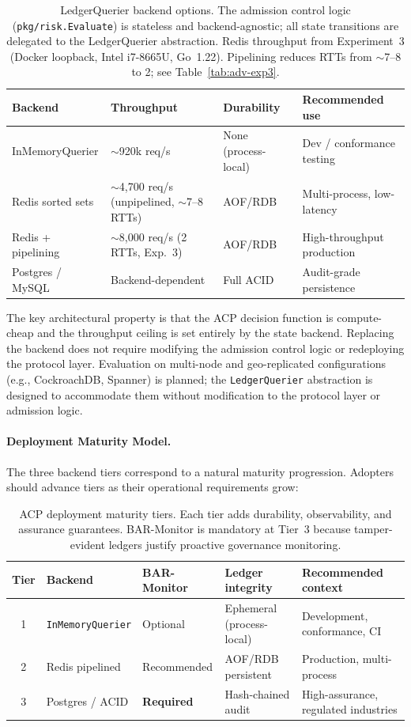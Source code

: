 \documentclass[11pt]{article}
\theoremstyle{definition}
\begin{document}
\begin{table}[h!]
\centering\small
\begin{tabular}{lp{4.2cm}lp{3.0cm}}
\toprule
Backend & Throughput & Durability & Recommended use \\
\midrule
InMemoryQuerier   & $\sim$920k req/s  & None (process-local) & Dev / conformance testing \\
Redis sorted sets & $\sim$4{,}700 req/s (unpipelined, $\sim$7--8 RTTs) & AOF/RDB & Multi-process, low-latency \\
Redis + pipelining & $\sim$8{,}000 req/s (2 RTTs, Exp.~3) & AOF/RDB & High-throughput production \\
Postgres / MySQL  & Backend-dependent & Full ACID & Audit-grade persistence \\
\bottomrule
\end{tabular}
\caption{LedgerQuerier backend options.
The admission control logic (\texttt{pkg/risk.Evaluate}) is stateless and backend-agnostic;
all state transitions are delegated to the LedgerQuerier abstraction.
Redis throughput from Experiment~3 (Docker loopback, Intel i7-8665U, Go~1.22).
Pipelining reduces RTTs from $\sim$7--8 to 2; see Table~\ref{tab:adv-exp3}.}
\label{tab:backends}
\end{table}

The key architectural property is that the ACP decision function is compute-cheap
and the throughput ceiling is set entirely by the state backend.
Replacing the backend does not require modifying the admission control logic
or redeploying the protocol layer.
Evaluation on multi-node and geo-replicated configurations (e.g., CockroachDB, Spanner)
is planned; the \texttt{LedgerQuerier} abstraction is designed to accommodate them without
modification to the protocol layer or admission logic.

\paragraph{Deployment Maturity Model.}
The three backend tiers correspond to a natural maturity progression.
Adopters should advance tiers as their operational requirements grow:

\begin{table}[h!]
\centering\small
\caption{ACP deployment maturity tiers.
Each tier adds durability, observability, and assurance guarantees.
BAR-Monitor is mandatory at Tier~3 because tamper-evident ledgers justify
proactive governance monitoring.}
\label{tab:maturity}
\begin{tabular}{@{}cllll@{}}
\toprule
Tier & Backend & BAR-Monitor & Ledger integrity & Recommended context \\
\midrule
1 & \texttt{InMemoryQuerier} & Optional & Ephemeral (process-local) & Development, conformance, CI \\
2 & Redis pipelined         & Recommended & AOF/RDB persistent & Production, multi-process \\
3 & Postgres / ACID         & \textbf{Required} & Hash-chained audit & High-assurance, regulated industries \\
\bottomrule
\end{tabular}
\end{table}
\end{document}
